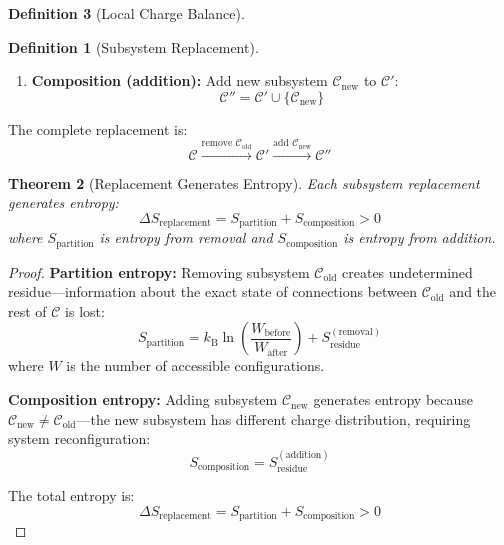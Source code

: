 \documentclass[12pt,a4paper]{article}
\theoremstyle{plain}
\newtheorem{theorem}{Theorem}[section]
\theoremstyle{definition}
\newtheorem{definition}[theorem]{Definition}
\theoremstyle{remark}
\newcommand{\kB}{k_{\mathrm{B}}}
\begin{document}
\begin{definition}[Local Charge Balance]
\begin{definition}[Subsystem Replacement]
\begin{enumerate}
\item \textbf{Composition (addition):} Add new subsystem $\mathcal{C}_{\text{new}}$ to $\mathcal{C}'$:
\begin{equation}
\mathcal{C}'' = \mathcal{C}' \cup \{\mathcal{C}_{\text{new}}\}
\end{equation}
\end{enumerate}

The complete replacement is:
\begin{equation}
\mathcal{C} \xrightarrow{\text{remove } \mathcal{C}_{\text{old}}} \mathcal{C}' \xrightarrow{\text{add } \mathcal{C}_{\text{new}}} \mathcal{C}''
\end{equation}
\end{definition}

\begin{theorem}[Replacement Generates Entropy]
\label{thm:replacement_entropy}
Each subsystem replacement generates entropy:
\begin{equation}
\Delta S_{\text{replacement}} = S_{\text{partition}} + S_{\text{composition}} > 0
\end{equation}
where $S_{\text{partition}}$ is entropy from removal and $S_{\text{composition}}$ is entropy from addition.
\end{theorem}

\begin{proof}
\textbf{Partition entropy:} Removing subsystem $\mathcal{C}_{\text{old}}$ creates undetermined residue—information about the exact state of connections between $\mathcal{C}_{\text{old}}$ and the rest of $\mathcal{C}$ is lost:
\begin{equation}
S_{\text{partition}} = \kB \ln\left(\frac{W_{\text{before}}}{W_{\text{after}}}\right) + S_{\text{residue}}^{(\text{removal})}
\end{equation}
where $W$ is the number of accessible configurations.

\textbf{Composition entropy:} Adding subsystem $\mathcal{C}_{\text{new}}$ generates entropy because $\mathcal{C}_{\text{new}} \neq \mathcal{C}_{\text{old}}$—the new subsystem has different charge distribution, requiring system reconfiguration:
\begin{equation}
S_{\text{composition}} = S_{\text{residue}}^{(\text{addition})}
\end{equation}

The total entropy is:
\begin{equation}
\Delta S_{\text{replacement}} = S_{\text{partition}} + S_{\text{composition}} > 0
\end{equation}


\end{proof}
\end{definition}
\end{document}
